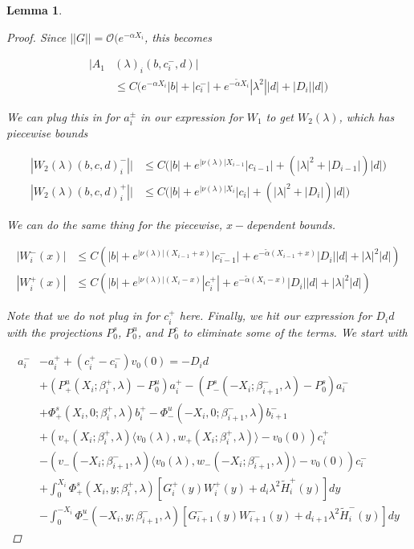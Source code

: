 \documentclass[12pt]{article}
\newtheorem{lemma}{Lemma}
\begin{document}
\begin{lemma}
\begin{proof}
Since $||G|| = \mathcal{O}(e^{-\alpha X_i}$, this becomes

\begin{align*}
|A_1&(\lambda)_i(b, c_i^-, d)| \\
&\leq C \Big( e^{-\alpha X_i} |b| + |c_i^-| + e^{-\tilde{\alpha} X_i} |\lambda^2| |d| + |D_i||d| \Big)
\end{align*} 

We can plug this in for $a_i^\pm$ in our expression for $W_1$ to get $W_2(\lambda)$, which has piecewise bounds

\begin{align*}
|W_2(\lambda)(b,c,d)_i^-|| &\leq C \Big( |b| + e^{|\nu(\lambda)|X_{i-1}}|c_{i-1}| + (|\lambda|^2 + |D_{i-1}|)|d| \Big) \\
|W_2(\lambda)(b,c,d)_i^+|| 
&\leq C \Big( |b| + e^{|\nu(\lambda)|X_i}|c_i| + (|\lambda|^2 + |D_i|)|d| \Big)
\end{align*}

We can do the same thing for the piecewise, $x-$dependent bounds.

\begin{align*}
|W_i^-(x)| &\leq C ( |b| + e^{|\nu(\lambda)|(X_{i-1} + x)} |c_{i-1}^-| + e^{-\tilde{\alpha}(X_{i-1} + x)}|D_i||d| + |\lambda|^2 |d| ) \\
|W_i^+(x)| &\leq C ( |b| + e^{|\nu(\lambda)|(X_i - x)} |c_i^+| + e^{-\tilde{\alpha}(X_i - x)}|D_i||d| + |\lambda|^2 |d| )
\end{align*}


Note that we do not plug in for $c_i^+$ here. Finally, we hit our expression for $D_i d$ with the projections $P^s_0$, $P^u_0$, and $P^c_0$ to eliminate some of the terms. We start with

\begin{align*}
a_i^- &- a_i^+ + (c_i^+ - c_i^-)v_0(0) = -D_i d  \\
&+ (P^u_+(X_i; \beta_i^+, \lambda) - P_0^u)a_i^+ - (P^s_-(-X_i; \beta_{i+1}^-,\lambda) - P_0^s)a_i^- \\
&+ \Phi^s_+(X_i, 0; \beta_i^+, \lambda)b_i^+ - \Phi^u_-(-X_i, 0; \beta_{i+1}^-, \lambda) b_{i+1}^- \\
&+ (v_+(X_i; \beta_i^+, \lambda) \langle v_0(\lambda), w_+(X_i; \beta_i^+, \lambda) \rangle - v_0(0) ) c_i^+ \\
&- (v_-(-X_i; \beta_{i+1}^-, \lambda) \langle v_0(\lambda), w_-(-X_i; \beta_{i+1}^-, \lambda) \rangle - v_0(0) ) c_i^- \\
&+ \int_0^{X_i} \Phi^s_+(X_i, y; \beta_i^+, \lambda) [ G_i^+(y) W_i^+(y) + d_i \lambda^2 \tilde{H}_i^+(y) ] dy \\
&- \int_0^{-X_i} \Phi^u_-(-X_i, y; \beta_{i+1}^-, \lambda) [ G_{i+1}^-(y) W_{i+1}^-(y) + d_{i+1} \lambda^2 \tilde{H}_i^-(y) ] dy
\end{align*}


\end{proof}
\end{lemma}
\end{document}
